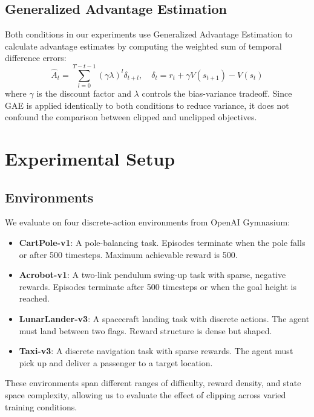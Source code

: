 \documentclass{article}
\begin{document}
\subsection{Generalized Advantage Estimation}

Both conditions in our experiments use Generalized Advantage Estimation
\citep{schulman2015gae} to calculate advantage estimates by computing the weighted sum of temporal difference errors:
\begin{equation}
    \hat{A}_t = \sum_{l=0}^{T-t-1} (\gamma\lambda)^l \delta_{t+l},
    \quad \delta_t = r_t + \gamma V(s_{t+1}) - V(s_t)
\end{equation}
where $\gamma$ is the discount factor and $\lambda$ controls the bias-variance tradeoff. Since GAE is applied identically to both conditions to reduce variance, it does not confound the comparison between clipped and unclipped objectives.

\section{Experimental Setup}

\subsection{Environments}

We evaluate on four discrete-action environments from OpenAI Gymnasium:
\begin{itemize}
    \item \textbf{CartPole-v1}: A pole-balancing task. Episodes terminate when the pole falls or after 500 timesteps. Maximum achievable reward is 500.
    \item \textbf{Acrobot-v1}: A two-link pendulum swing-up task with sparse, negative rewards. Episodes terminate after 500 timesteps or when the goal height is reached.
    \item \textbf{LunarLander-v3}: A spacecraft landing task with discrete actions. The agent must land between two flags. Reward structure is dense but shaped.
    \item \textbf{Taxi-v3}: A discrete navigation task with sparse rewards. The agent must pick up and deliver a passenger to a target location.
\end{itemize}
These environments span different ranges of difficulty, reward density, and state space complexity, allowing us to evaluate the effect of clipping across varied training conditions.
\end{document}
